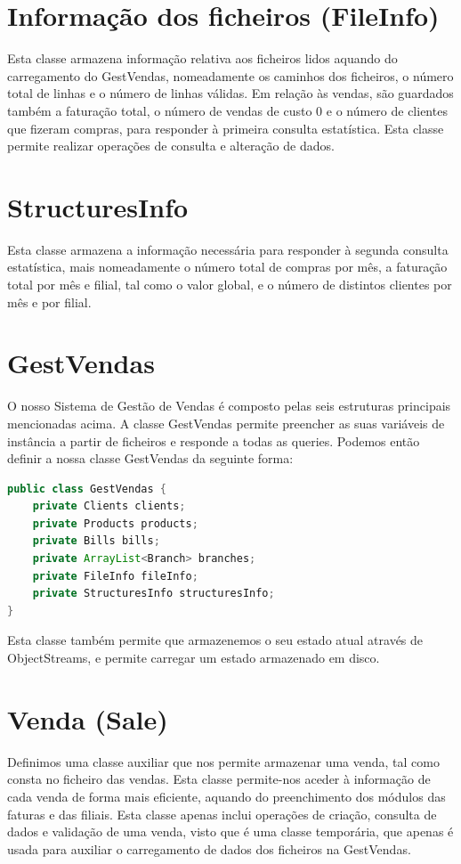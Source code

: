 \documentclass[a4paper]{report}
\begin{document}
	\section{Informação dos ficheiros (FileInfo)}
	Esta classe armazena informação relativa aos ficheiros lidos aquando do carregamento do GestVendas, nomeadamente os caminhos dos ficheiros, o número total de linhas e o número de linhas válidas. Em relação às vendas, são guardados também a faturação total, o número de vendas de custo 0 e o número de clientes que fizeram compras, para responder à primeira consulta estatística. Esta classe permite realizar operações de consulta e alteração de dados.
	
	\section{StructuresInfo}
	Esta classe armazena a informação necessária para responder à segunda consulta estatística, mais nomeadamente o número total de compras por mês, a faturação total por mês e filial, tal como o valor global, e o número de distintos clientes por mês e por filial.

	\section{GestVendas}
	O nosso Sistema de Gestão de Vendas é composto pelas seis estruturas principais mencionadas acima. A classe GestVendas permite preencher as suas variáveis de instância a partir de ficheiros e responde a todas as queries.
	Podemos então definir a nossa classe GestVendas da seguinte forma:
	\begin{lstlisting}[language=Java]
public class GestVendas {
    private Clients clients;
    private Products products;
    private Bills bills;
    private ArrayList<Branch> branches;
    private FileInfo fileInfo;
    private StructuresInfo structuresInfo;
}
	\end{lstlisting}
	Esta classe também permite que armazenemos o seu estado atual através de ObjectStreams, e permite carregar um estado armazenado em disco.
	
	\section{Venda (Sale)}
	Definimos uma classe auxiliar que nos permite armazenar uma venda, tal como consta no ficheiro das vendas. Esta classe permite-nos aceder à informação de cada venda de forma mais eficiente, aquando do preenchimento dos módulos das faturas e das filiais. Esta classe apenas inclui operações de criação, consulta de dados e validação de uma venda, visto que é uma classe temporária, que apenas é usada para auxiliar o carregamento de dados dos ficheiros na GestVendas.
		
\end{document}
